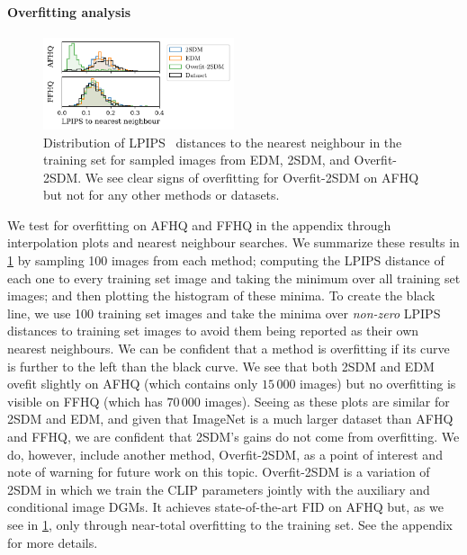 \paragraph{Overfitting analysis}
\begin{figure}
    \centering
    \includegraphics[width=0.5\textwidth]{figs/2sdm/afhq_ffhq.pdf}
    \caption{Distribution of LPIPS~\citep{zhang2018perceptual} distances to the nearest neighbour in the training set for sampled images from EDM, 2SDM, and Overfit-2SDM. We see clear signs of overfitting for Overfit-2SDM on AFHQ but not for any other methods or datasets. }
    \label{fig:overfit-2SDM-nearest-neighbours}
\end{figure}
We test for overfitting on AFHQ and FFHQ in the appendix through interpolation plots and nearest neighbour searches.
We summarize these results in \cref{fig:overfit-2SDM-nearest-neighbours} by sampling 100 images from each method; computing the LPIPS distance of each one to every training set image and taking the minimum over all training set images; and then plotting the histogram of these minima. To create the black line, we use 100 training set images and take the minima over \textit{non-zero} LPIPS distances to training set images to avoid them being reported as their own nearest neighbours. We can be confident that a method is overfitting if its curve is further to the left than the black curve. We see that both 2SDM and EDM ovefit slightly on AFHQ (which contains only $15\,000$ images) but no overfitting is visible on FFHQ (which has $70\,000$ images). Seeing as these plots are similar for 2SDM and EDM, and given that ImageNet is a much larger dataset than AFHQ and FFHQ, we are confident that 2SDM's gains do not come from overfitting. We do, however, include another method, Overfit-2SDM, as a point of interest and note of warning for future work on this topic. Overfit-2SDM is a variation of 2SDM in which we train the CLIP parameters jointly with the auxiliary and conditional image DGMs. It achieves state-of-the-art FID on AFHQ but, as we see in \cref{fig:overfit-2SDM-nearest-neighbours}, only through near-total overfitting to the training set. See the appendix for more details.



